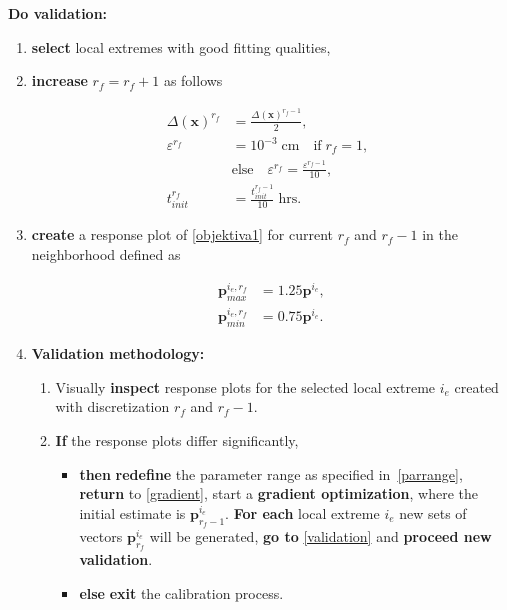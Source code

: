 \documentclass[review,times,3p,10pt]{elsarticle}
\newenvironment{lineq}
    {\begin{linenomath*}
    \begin{equation}
    }
    { 
    \end{equation} 
    \end{linenomath*}
    }
\renewcommand{\vec}{\mathbf}
\begin{document}
\begin{enumerate}[label={\bf [\Roman*.]}]
 \item \label{validation} {\bf Do validation:}  
    \begin{enumerate} 
      \item {\bf select} local extremes with good fitting qualities,
        \item {\bf increase} $r_f=r_f+1$ as follows 
                  \begin{lineq}
                  \label{coeffs}
                  \begin{split}
                  \Delta(\vec{x})^{r_f}  &= \frac{\Delta(\vec{x})^{r_f-1}}{2}, \\
                  \varepsilon^{r_f} &= 10^{-3} \; \mbox{cm} \quad  \mbox{if} \; r_f = 1, \; \; \\ &\mbox{else} \quad \varepsilon^{r_f} = \frac{\varepsilon^{r_f-1}}{10}, \\
                  t_{init}^{r_f} &=  \frac{t_{init}^{r_f-1}}{10} \; \mbox{hrs} .
                  \end{split}
                  \end{lineq}
        \item {\bf create} a response plot of \eqref{objektiva1} for current $r_f$ and $r_f-1$ in the neighborhood defined as 
            \begin{lineq}
            \label{parrange}
              \begin{split}
              \vec{p}^{i_e, r_f}_{max} &= 1.25\vec{p}^{i_e}, \\
              \vec{p}^{i_e,r_f}_{min} &= 0.75\vec{p}^{i_e}. 
              \end{split}
            \end{lineq}
            
       \item {\bf Validation methodology:}
       
       \begin{enumerate}
       \item Visually {\bf inspect} response  plots for the selected local extreme $i_e$ created with discretization $r_f$ and $r_f-1$.
       \item \label{cond} {\bf If} the response plots differ significantly,
       \begin{itemize}
          \item { {\bf then} {\bf redefine} the parameter range as specified in~\eqref{parrange}, {\bf return} to \ref{gradient},
          start a {\bf gradient optimization}, where the initial estimate is $\vec{p}_{r_f-1}^{i_e}$. {\bf For each} local extreme $i_e$
            new sets of vectors  $\vec{p}_{r_f}^{i_e}$ will be generated, {\bf go to}  \ref{validation} and {\bf proceed new validation}. } 
          \item {\bf else} {\bf exit} the calibration process.
      \end{itemize}
\end{enumerate}

\end{enumerate}
\end{enumerate}
\end{document}
